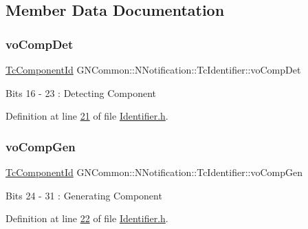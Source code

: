 \subsection{Member Data Documentation}
\mbox{\label{class_g_n_common_1_1_n_notification_1_1_tc_identifier_a226babb1936c6e0841174fd1baac3476}} 
\subsubsection{\texorpdfstring{vo\+Comp\+Det}{voCompDet}}
{\footnotesize\ttfamily \mbox{\hyperlink{namespace_g_n_common_1_1_n_notification_ab468f440599e6d5a51d887dfa55b06b3}{Tc\+Component\+Id}} G\+N\+Common\+::\+N\+Notification\+::\+Tc\+Identifier\+::vo\+Comp\+Det}

Bits 16 -\/ 23 \+: Detecting Component 

Definition at line \mbox{\hyperlink{_identifier_8h_source_l00021}{21}} of file \mbox{\hyperlink{_identifier_8h_source}{Identifier.\+h}}.

\mbox{\label{class_g_n_common_1_1_n_notification_1_1_tc_identifier_a259c70f5d04a2cb6e8c674a07f903aff}} 
\subsubsection{\texorpdfstring{vo\+Comp\+Gen}{voCompGen}}
{\footnotesize\ttfamily \mbox{\hyperlink{namespace_g_n_common_1_1_n_notification_ab468f440599e6d5a51d887dfa55b06b3}{Tc\+Component\+Id}} G\+N\+Common\+::\+N\+Notification\+::\+Tc\+Identifier\+::vo\+Comp\+Gen}

Bits 24 -\/ 31 \+: Generating Component 

Definition at line \mbox{\hyperlink{_identifier_8h_source_l00022}{22}} of file \mbox{\hyperlink{_identifier_8h_source}{Identifier.\+h}}.

